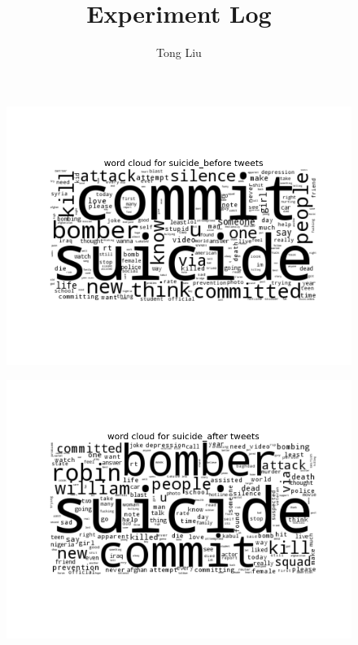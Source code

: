 \documentclass[11pt, oneside]{article}   	%
\title{Experiment Log}
\author{Tong Liu}
\begin{document}
\maketitle

 \begin{figure}
 \includegraphics[width=\textwidth]{../figures/suicide_before.png}
 \centering
 \end{figure}

 \begin{figure}
 \includegraphics[width=\textwidth]{../figures/suicide_after.png}
 \centering
 \end{figure}
\end{document}
